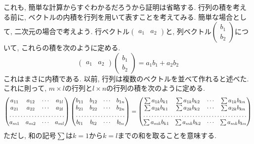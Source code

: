 \documentclass[a4j,dvipdfmx]{jsarticle}
\numberwithin{equation}{section}
\begin{document}
            これも, 簡単な計算からすぐわかるだろうから証明は省略する.
            \clearpage
            行列の積を考える前に, ベクトルの内積を行列を用いて表すことを考えてみる. 簡単な場合として, 二次元の場合で考えよう.
            行ベクトル$\begin{pmatrix}
                a_1 & a_2 
            \end{pmatrix}$と, 列ベクトル$\begin{pmatrix}
                b_1\\b_2
            \end{pmatrix}$について, これらの積を次のように定める.
            \begin{equation*}
                \begin{pmatrix}
                a_1 & a_2 
            \end{pmatrix}\begin{pmatrix}
                b_1\\b_2
            \end{pmatrix}=a_1b_1+a_2b_2
            \end{equation*}
            これはまさに内積である. 以前, 行列は複数のベクトルを並べて作れると述べた. これに則って, $m\times l$の行列と$l\times n$の行列の積を次のように定める.
            \begin{equation}
                \begin{pmatrix}
                    a_{11} & a_{12} & \cdots & a_{1l}\\
                    a_{21} & a_{22} & \cdots & a_{2l}\\
                    \hdotsfor{4}\\
                    a_{m1} & a_{m2} & \cdots & a_{ml}
                \end{pmatrix}
                \begin{pmatrix}
                    b_{11} & b_{12} & \cdots & b_{1n}\\
                    b_{21} & b_{22} & \cdots & b_{2n}\\
                    \hdotsfor{4}\\
                    b_{l1} & b_{l2} & \cdots & b_{ln}
                \end{pmatrix}                    
                =\begin{pmatrix}
                    \sum a_{1k}b_{k1} & \sum a_{1k}b_{k2} & \cdots & \sum a_{1k}b_{kn}\\
                    \sum a_{2k}b_{k1} & \sum a_{2k}b_{k2} & \cdots & \sum a_{2k}b_{kn}\\
                    \hdotsfor{4}\\
                    \sum a_{mk}b_{k1} & \sum a_{mk}b_{k2} & \cdots & \sum a_{mk}b_{kn}
                \end{pmatrix} \label{eq:線形代数:行列の積}
            \end{equation}
            ただし, 和の記号$\sum$は$k=1$から$k=l$までの和を取ることを意味する.
\end{document}
